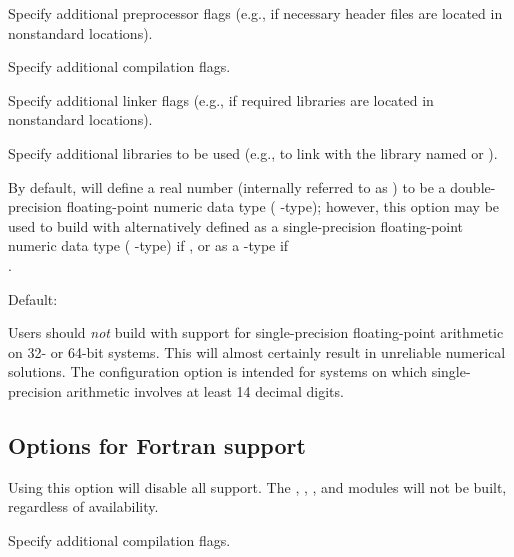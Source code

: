 \begin{config}
\item {}

  Specify additional {\C} preprocessor flags 
  (e.g.,  if necessary header files are located in nonstandard locations).

\item {}

  Specify additional {\C} compilation flags.

\item {}

  Specify additional linker flags 
  (e.g.,  if required libraries are located in nonstandard locations).

\item {}

  Specify additional libraries to be used 
  (e.g.,  to link with the library named  or ).

\item {}

  By default, {\sundials} will define a real number (internally referred to as
  ) to be a double-precision floating-point numeric data type
  ( {\C}-type); however, this option may be used to build {\sundials}
  with  alternatively defined as a single-precision floating-point
  numeric data type ( {\C}-type) if , or as a
   {\C}-type if \\ .

  Default: 

  {\warn}Users should {\em not} build {\sundials} with support for
  single-precision floating-point arithmetic on 32- or 64-bit systems.
  This will almost certainly result in unreliable numerical solutions.
  The configuration option  is intended for
  systems on which single-precision arithmetic involves at least 14 decimal
  digits.

\end{config}


\subsection*{Options for Fortran support}

\begin{config}

\item {}

  Using this option will disable all {\F} support. The {\fcvode},
 {\fkinsol}, {\fida}, and {\fnvector} modules will not be built,
 regardless of availability.

\item {}

  Specify additional {\F} compilation flags.

\end{config}

